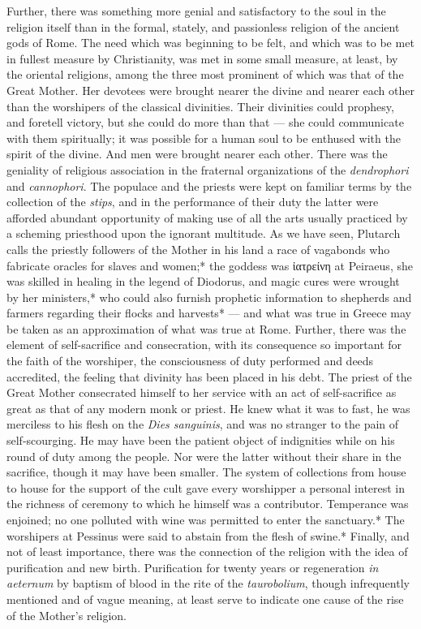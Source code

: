 \documentclass[a4paper, 11pt, oneside, polutonikogreek, english]{article}
\begin{document}
Further, there was something more genial and satisfactory to the soul in the religion itself than in the formal, stately, and passionless religion of the ancient gods of Rome. The need which was beginning to be felt, and which was to be met in fullest measure by Christianity, was met in some small measure, at least, by the oriental religions, among the three most prominent of which was that of the Great Mother. Her devotees were brought nearer the divine and nearer each other than the worshipers of the classical divinities. Their divinities could prophesy, and foretell victory, but she could do more than that --- she could communicate with them spiritually; it was possible for a human soul to be enthused with the spirit of the divine. And men were brought nearer each other. There was the geniality of religious association in the fraternal organizations of the \emph{dendrophori} and \emph{cannophori}. The populace and the priests were kept on familiar terms by the collection of the \emph{stips}, and in the performance of their duty the latter were afforded abundant opportunity of making use of all the arts usually practiced by a scheming priesthood upon the ignorant multitude. As we have seen, Plutarch calls the priestly followers of the Mother in his land a race of vagabonds who fabricate oracles for slaves and women;* the goddess was ἰατρείνη at Peiraeus, she was skilled in healing in the legend of Diodorus, and magic cures were wrought by her ministers,* who could also furnish prophetic information to shepherds and farmers regarding their flocks and harvests* --- and what was true in Greece may be taken as an approximation of what was true at Rome. Further, there was the element of self-sacrifice and consecration, with its consequence so important for the faith of the worshiper, the consciousness of duty performed and deeds accredited, the feeling that divinity has been placed in his debt. The priest of the Great Mother consecrated himself to her service with an act of self-sacrifice as great as that of any modern monk or priest. He knew what it was to fast, he was merciless to his flesh on the \emph{Dies sanguinis}, and was no stranger to the pain of self-scourging. He may have been the patient object of indignities while on his round of duty among the people. Nor were the latter without their share in the sacrifice, though it may have been smaller. The system of collections from house to house for the support of the cult gave every worshipper a personal interest in the richness of ceremony to which he himself was a contributor. Temperance was enjoined; no one polluted with wine was permitted to enter the sanctuary.* The worshipers at Pessinus were said to abstain from the flesh of swine.* Finally, and not of least importance, there was the connection of the religion with the idea of purification and new birth. Purification for twenty years or regeneration \emph{in aeternum} by baptism of blood in the rite of the \emph{taurobolium}, though infrequently mentioned and of vague meaning, at least serve to indicate one cause of the rise of the Mother's religion.
\end{document}
